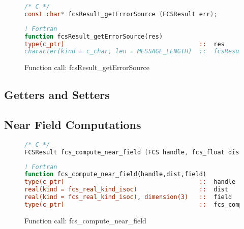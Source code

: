 \begin{figure}[htb]
\begin{lstlisting}[language=C,frame=trBL,breaklines,basicstyle=\ttfamily,prebreak={\raisebox{0ex}[0ex][0ex]{\ensuremath{\hookleftarrow}}}]
/* C */
const char* fcsResult_getErrorSource (FCSResult err);
\end{lstlisting}
\begin{lstlisting}[language=Fortran,frame=trBL,breaklines,basicstyle=\ttfamily,prebreak={\raisebox{0ex}[0ex][0ex]{\ensuremath{\hookleftarrow}}}]
! Fortran
function fcsResult_getErrorSource(res)
type(c_ptr)                                     ::  res
character(kind = c_char, len = MESSAGE_LENGTH)  ::  fcsResult_getErrorSource
\end{lstlisting}
\caption{Function call: fcsResult\_getErrorSource}
\label{fig:fcsResult_getErrorSource}
\end{figure}

\FloatBarrier
\subsection{Getters and Setters}



\FloatBarrier
\subsection{Near Field Computations}

\begin{figure}[htb]
\begin{lstlisting}[language=C,frame=trBL,breaklines,basicstyle=\ttfamily,prebreak={\raisebox{0ex}[0ex][0ex]{\ensuremath{\hookleftarrow}}}]
/* C */
FCSResult fcs_compute_near_field (FCS handle, fcs_float dist, fcs_float *field);
\end{lstlisting}
\begin{lstlisting}[language=Fortran,frame=trBL,breaklines,basicstyle=\ttfamily,prebreak={\raisebox{0ex}[0ex][0ex]{\ensuremath{\hookleftarrow}}}]
! Fortran
function fcs_compute_near_field(handle,dist,field)
type(c_ptr)                                     ::  handle
real(kind = fcs_real_kind_isoc)                 ::  dist
real(kind = fcs_real_kind_isoc), dimension(3)   ::  field
type(c_ptr)                                     ::  fcs_compute_near_field
\end{lstlisting}
\caption{Function call: fcs\_compute\_near\_field}
\label{fig:fcs_compute_near_field}
\end{figure}

